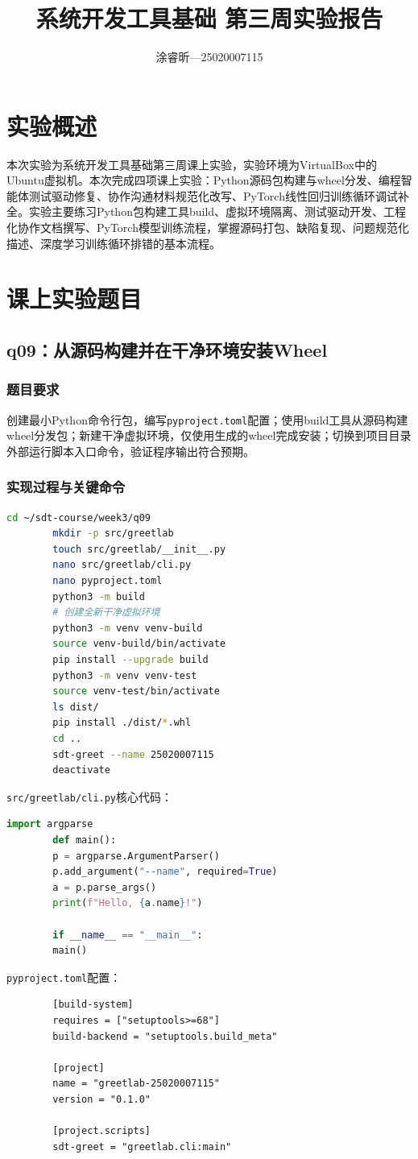 \documentclass[a4paper,12pt]{ctexart}
\begin{document}
	
	\title{系统开发工具基础 第三周实验报告}
	\author{涂睿昕---25020007115}
	\maketitle
	
	\section{实验概述}
	本次实验为系统开发工具基础第三周课上实验，实验环境为VirtualBox中的Ubuntu虚拟机。本次完成四项课上实验：Python源码包构建与wheel分发、编程智能体测试驱动修复、协作沟通材料规范化改写、PyTorch线性回归训练循环调试补全。实验主要练习Python包构建工具build、虚拟环境隔离、测试驱动开发、工程化协作文档撰写、PyTorch模型训练流程，掌握源码打包、缺陷复现、问题规范化描述、深度学习训练循环排错的基本流程。
	
	\section{课上实验题目}
	\subsection{q09：从源码构建并在干净环境安装Wheel}
	\subsubsection{题目要求}
	创建最小Python命令行包，编写\texttt{pyproject.toml}配置；使用build工具从源码构建wheel分发包；新建干净虚拟环境，仅使用生成的wheel完成安装；切换到项目目录外部运行脚本入口命令，验证程序输出符合预期。
	
	\subsubsection{实现过程与关键命令}
	\begin{lstlisting}[language=bash]
		cd ~/sdt-course/week3/q09
		mkdir -p src/greetlab
		touch src/greetlab/__init__.py
		nano src/greetlab/cli.py
		nano pyproject.toml
		python3 -m build
		# 创建全新干净虚拟环境
		python3 -m venv venv-build
		source venv-build/bin/activate
		pip install --upgrade build
		python3 -m venv venv-test
		source venv-test/bin/activate
		ls dist/
		pip install ./dist/*.whl
		cd ..
		sdt-greet --name 25020007115
		deactivate
	\end{lstlisting}
	\texttt{src/greetlab/cli.py}核心代码：
	\begin{lstlisting}[language=Python]
		import argparse
		def main():
		p = argparse.ArgumentParser()
		p.add_argument("--name", required=True)
		a = p.parse_args()
		print(f"Hello, {a.name}!")
		
		if __name__ == "__main__":
		main()
	\end{lstlisting}
	\texttt{pyproject.toml}配置：
	\begin{lstlisting}
		[build-system]
		requires = ["setuptools>=68"]
		build-backend = "setuptools.build_meta"
		
		[project]
		name = "greetlab-25020007115"
		version = "0.1.0"
		
		[project.scripts]
		sdt-greet = "greetlab.cli:main"
	\end{lstlisting}
	
\end{document}
